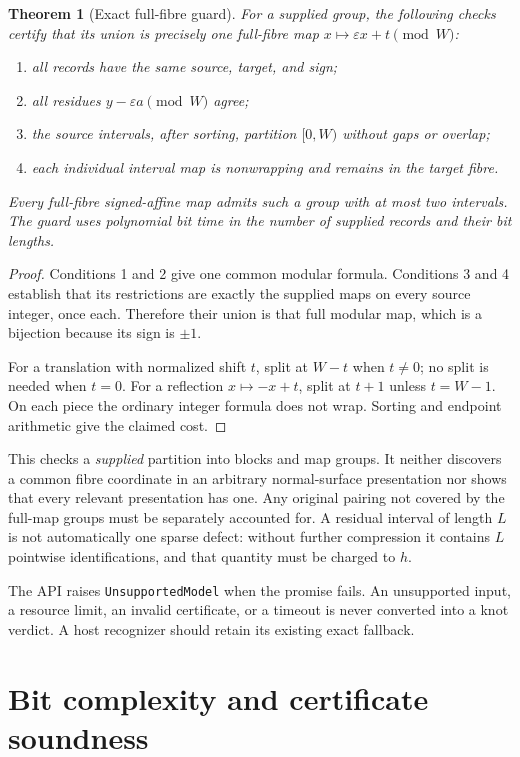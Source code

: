 \documentclass[11pt]{article}
\newtheorem{theorem}{Theorem}[section]
\theoremstyle{definition}
\newcommand{\code}[1]{\texttt{#1}}
\newcommand{\eps}{\varepsilon}
\begin{document}
\begin{theorem}[Exact full-fibre guard]
\label{thm:guard}
For a supplied group, the following checks certify that its union is precisely one full-fibre map $x\mapsto\eps x+t\pmod W$:
\begin{enumerate}[leftmargin=*,itemsep=1pt]
\item all records have the same source, target, and sign;
\item all residues $y-\eps a\pmod W$ agree;
\item the source intervals, after sorting, partition $[0,W)$ without gaps or overlap;
\item each individual interval map is nonwrapping and remains in the target fibre.
\end{enumerate}
Every full-fibre signed-affine map admits such a group with at most two intervals. The guard uses polynomial bit time in the number of supplied records and their bit lengths.
\end{theorem}
\begin{proof}
Conditions 1 and 2 give one common modular formula. Conditions 3 and 4 establish that its restrictions are exactly the supplied maps on every source integer, once each. Therefore their union is that full modular map, which is a bijection because its sign is $\pm1$.

For a translation with normalized shift $t$, split at $W-t$ when $t\ne0$; no split is needed when $t=0$. For a reflection $x\mapsto-x+t$, split at $t+1$ unless $t=W-1$. On each piece the ordinary integer formula does not wrap. Sorting and endpoint arithmetic give the claimed cost.
\end{proof}

This checks a \emph{supplied} partition into blocks and map groups. It neither discovers a common fibre coordinate in an arbitrary normal-surface presentation nor shows that every relevant presentation has one. Any original pairing not covered by the full-map groups must be separately accounted for. A residual interval of length $L$ is not automatically one sparse defect: without further compression it contains $L$ pointwise identifications, and that quantity must be charged to $h$.

The API raises \code{UnsupportedModel} when the promise fails. An unsupported input, a resource limit, an invalid certificate, or a timeout is never converted into a knot verdict. A host recognizer should retain its existing exact fallback.

\section{Bit complexity and certificate soundness}
\label{sec:complexity}
\end{document}
